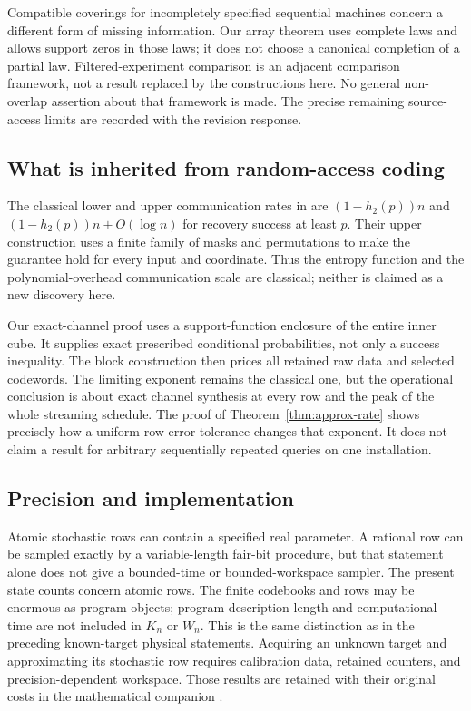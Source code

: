 Compatible coverings for incompletely specified sequential machines
\cite{Reusch} concern a different form of missing information. Our
array theorem uses complete laws and allows support zeros in those
laws; it does not choose a canonical completion of a partial law.
Filtered-experiment comparison \cite{Norberg} is an adjacent comparison
framework, not a result replaced by the constructions here. No general
non-overlap assertion about that framework is made. The precise
remaining source-access limits are recorded with the revision response.

\subsection{What is inherited from random-access coding}
The classical lower and upper communication rates in
\cite[Theorems 2.1 and 2.2]{ANTVpre} are
$(1-h_2(p))n$ and $(1-h_2(p))n+O(\log n)$ for recovery success at
least $p$. Their upper construction uses a finite family of masks and
permutations to make the guarantee hold for every input and coordinate.
Thus the entropy function and the polynomial-overhead communication
scale are classical; neither is claimed as a new discovery here.

Our exact-channel proof uses a support-function enclosure of the entire
inner cube. It supplies exact prescribed conditional probabilities,
not only a success inequality. The block construction then prices all
retained raw data and selected codewords. The limiting exponent remains
the classical one, but the operational conclusion is about exact channel
synthesis at every row and the peak of the whole streaming schedule.
The proof of Theorem~\ref{thm:approx-rate} shows precisely how a uniform
row-error tolerance changes that exponent. It does not claim a result
for arbitrary sequentially repeated queries on one installation.

\subsection{Precision and implementation}
Atomic stochastic rows can contain a specified real parameter. A
rational row can be sampled exactly by a variable-length fair-bit
procedure, but that statement alone does not give a bounded-time or
bounded-workspace sampler. The present state counts concern atomic
rows. The finite codebooks and rows may be enormous as program objects;
program description length and computational time are not included in
$K_n$ or $W_n$. This is the same distinction as in the preceding
known-target physical statements. Acquiring an unknown target and
approximating its stochastic row requires calibration data, retained
counters, and precision-dependent workspace. Those results are retained
with their original costs in the mathematical companion \cite{GTF29}.

